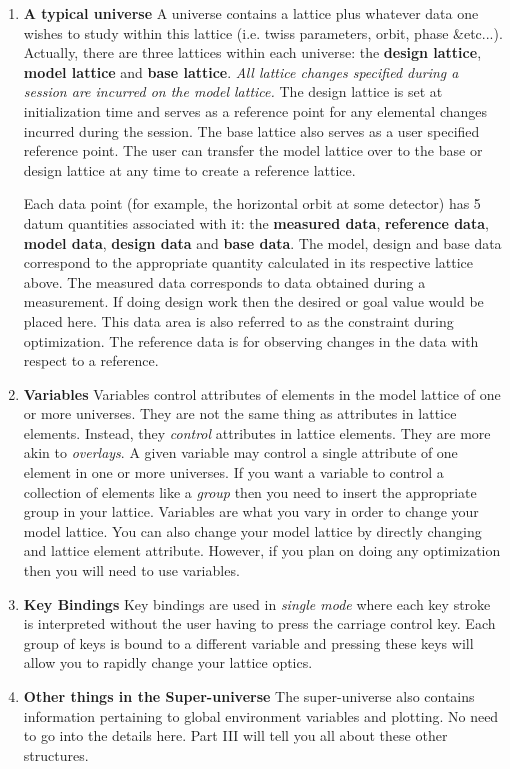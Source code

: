 \begin{enumerate}

\item \textbf{A typical universe}
\Newline A universe contains a \bmad lattice
plus whatever data one wishes to study within this lattice (i.e. twiss
parameters, orbit, phase \&etc...). Actually, there are three lattices within
each universe: the \textbf{design lattice}, \textbf{model lattice} and
\textbf{base lattice}. \emph{All lattice changes specified during a \tao session
are incurred on the model lattice.} The design lattice is set at initialization
time and serves as a reference point for any elemental changes incurred during
the \tao session. The base lattice also serves as a user specified reference
point. The user can transfer the model lattice over to the base or design
lattice at any time to create a reference lattice.

Each data point (for example, the horizontal orbit at some detector) has 5 datum
 quantities associated with it: the \textbf{measured data}, \textbf{reference
data}, \textbf{model data}, \textbf{design data} and \textbf{base data}. The
model, design and base data correspond to the appropriate quantity
calculated in its respective lattice above. The measured data corresponds to 
data obtained during a measurement. If doing design work then the desired or
goal
value would be placed here. This data area is also referred to as the constraint during
optimization. The reference data is for observing changes in the data with
respect to a reference.

\item \textbf{Variables} \Newline
Variables control attributes of elements in the model lattice of one or more
universes. They are not the same thing as attributes in lattice elements.
Instead, they \textit{control} attributes in lattice elements. They are
more akin to \bmad \textit{overlays}. A given variable may control a single 
attribute of one element
in one or more universes. If you want a variable to control a collection of
elements like a \bmad \textit{group} then you need to insert the appropriate
group in your lattice. Variables are what you vary in order to change
your model lattice. You can also change your model lattice by directly changing
and lattice element attribute. However, if you plan on doing any optimization then 
you will need to use variables.

\item \textbf{Key Bindings} \Newline
Key bindings are used in \textit{single mode} where each key
stroke is interpreted without the user having to press the carriage control key.
Each group of keys is bound to a different variable and pressing these keys will
allow you to rapidly change your lattice optics.

\item \textbf{Other things in the Super-universe} \Newline
The super-universe also contains information pertaining to global environment variables and
plotting. No need to go into the details here. Part III will
tell you all about these other structures.
\end{enumerate}

